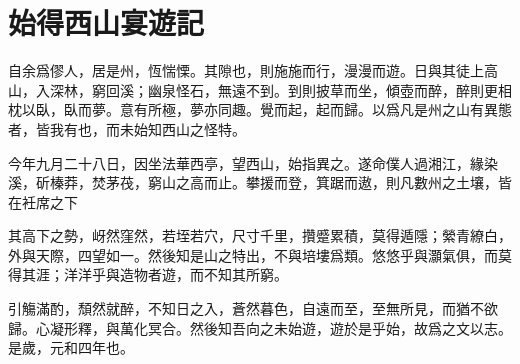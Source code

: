 \section{始得西山宴遊記}

自余爲僇人，居是州，恆惴慄。其隙也，則施施而行，漫漫而遊。日與其徒上高山，入深林，窮回溪；幽泉怪石，無遠不到。到則披草而坐，傾壺而醉，醉則更相枕以臥，臥而夢。意有所極，夢亦同趣。覺而起，起而歸。以爲凡是州之山有異態者，皆我有也，而未始知西山之怪特。

今年九月二十八日，因坐法華西亭，望西山，始指異之。遂命僕人過湘江，緣染溪，斫榛莽，焚茅茷，窮山之高而止。攀援而登，箕踞而遨，則凡數州之土壤，皆在衽席之下

其高下之勢，岈然窪然，若垤若穴，尺寸千里，攢蹙累積，莫得遁隱；縈青繚白，外與天際，四望如一。然後知是山之特出，不與培塿爲類。悠悠乎與灝氣俱，而莫得其涯；洋洋乎與造物者遊，而不知其所窮。

引觴滿酌，頹然就醉，不知日之入，蒼然暮色，自遠而至，至無所見，而猶不欲歸。心凝形釋，與萬化冥合。然後知吾向之未始遊，遊於是乎始，故爲之文以志。是歲，元和四年也。